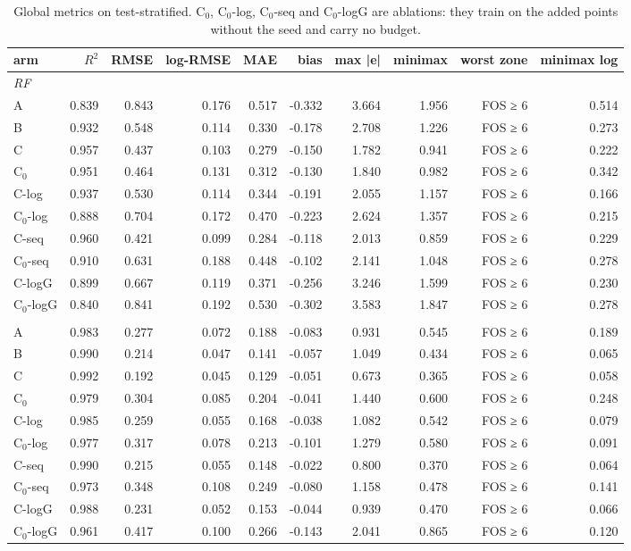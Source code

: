 \begin{table}[htbp]
\centering
\small
\setlength{\tabcolsep}{4pt}
\caption{Global metrics on test-stratified. C$_0$, C$_0$-log, C$_0$-seq and C$_0$-logG are ablations: they train on the added points without the seed and carry no budget.}
\label{tab:test-stratified__fos-rmse:global}
\begin{tabular}{lrrrrrrrrr}
\toprule
arm & $R^2$ & RMSE & log-RMSE & MAE & bias & max |e| & minimax & worst zone & minimax log \\
\midrule
\multicolumn{10}{l}{\textit{RF}} \\
A & 0.839 & 0.843 & 0.176 & 0.517 & -0.332 & 3.664 & 1.956 & FOS ≥ 6 & 0.514 \\
B & 0.932 & 0.548 & 0.114 & 0.330 & -0.178 & 2.708 & 1.226 & FOS ≥ 6 & 0.273 \\
C & 0.957 & 0.437 & 0.103 & 0.279 & -0.150 & 1.782 & 0.941 & FOS ≥ 6 & 0.222 \\
C$_0$ & 0.951 & 0.464 & 0.131 & 0.312 & -0.130 & 1.840 & 0.982 & FOS ≥ 6 & 0.342 \\
C-log & 0.937 & 0.530 & 0.114 & 0.344 & -0.191 & 2.055 & 1.157 & FOS ≥ 6 & 0.166 \\
C$_0$-log & 0.888 & 0.704 & 0.172 & 0.470 & -0.223 & 2.624 & 1.357 & FOS ≥ 6 & 0.215 \\
C-seq & 0.960 & 0.421 & 0.099 & 0.284 & -0.118 & 2.013 & 0.859 & FOS ≥ 6 & 0.229 \\
C$_0$-seq & 0.910 & 0.631 & 0.188 & 0.448 & -0.102 & 2.141 & 1.048 & FOS ≥ 6 & 0.278 \\
C-logG & 0.899 & 0.667 & 0.119 & 0.371 & -0.256 & 3.246 & 1.599 & FOS ≥ 6 & 0.230 \\
C$_0$-logG & 0.840 & 0.841 & 0.192 & 0.530 & -0.302 & 3.583 & 1.847 & FOS ≥ 6 & 0.278 \\
\addlinespace
\multicolumn{10}{l}{\textit{GBM}} \\
A & 0.983 & 0.277 & 0.072 & 0.188 & -0.083 & 0.931 & 0.545 & FOS ≥ 6 & 0.189 \\
B & 0.990 & 0.214 & 0.047 & 0.141 & -0.057 & 1.049 & 0.434 & FOS ≥ 6 & 0.065 \\
C & 0.992 & 0.192 & 0.045 & 0.129 & -0.051 & 0.673 & 0.365 & FOS ≥ 6 & 0.058 \\
C$_0$ & 0.979 & 0.304 & 0.085 & 0.204 & -0.041 & 1.440 & 0.600 & FOS ≥ 6 & 0.248 \\
C-log & 0.985 & 0.259 & 0.055 & 0.168 & -0.038 & 1.082 & 0.542 & FOS ≥ 6 & 0.079 \\
C$_0$-log & 0.977 & 0.317 & 0.078 & 0.213 & -0.101 & 1.279 & 0.580 & FOS ≥ 6 & 0.091 \\
C-seq & 0.990 & 0.215 & 0.055 & 0.148 & -0.022 & 0.800 & 0.370 & FOS ≥ 6 & 0.064 \\
C$_0$-seq & 0.973 & 0.348 & 0.108 & 0.249 & -0.080 & 1.158 & 0.478 & FOS ≥ 6 & 0.141 \\
C-logG & 0.988 & 0.231 & 0.052 & 0.153 & -0.044 & 0.939 & 0.470 & FOS ≥ 6 & 0.066 \\
C$_0$-logG & 0.961 & 0.417 & 0.100 & 0.266 & -0.143 & 2.041 & 0.865 & FOS ≥ 6 & 0.120 \\
\bottomrule
\end{tabular}
\end{table}
